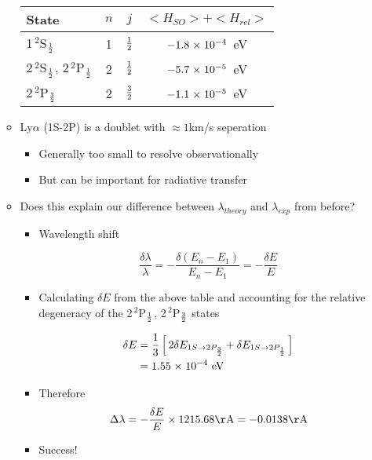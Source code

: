 \documentclass[12pt,letterpaper]{article}
\begin{document}
\begin{Aenumerate}
\begin{itemize}
\begin{itemize}
\begin{center}
\begin{tabular}{lccc}
\hline
State & $n$ & $j$ & $<H_{SO}> + <H_{rel}>$ \\
\hline
1\,$^2$S$_{\frac{1}{2}}$ & 1 & $\frac{1}{2}$ & $-1.8 {\; \times \; 10^{-4}}$~eV \\
2\,$^2$S$_{\frac{1}{2}}$, 2\,$^2$P$_{\frac{1}{2}}$ & 2 & $\frac{1}{2}$ & $-5.7 {\; \times \; 10^{-5}}$~eV \\
2\,$^2$P$_{\frac{3}{2}}$ & 2 & $\frac{3}{2}$ & $-1.1 {\; \times \; 10^{-5}}$~eV \\
\hline
\end{tabular}
\end{center}

	\item Ly$\alpha$ (1S-2P) is a doublet with $\approx 1$km/s seperation
		\begin{itemize}
		\item Generally too small to resolve observationally
		\item But can be important for radiative transfer 
		\end{itemize}
	\item Does this explain our difference between $\lambda_{theory}$
		and $\lambda_{exp}$ from before?
		\begin{itemize}
		\item Wavelength shift 

\begin{equation*}
\frac{\delta \lambda}{\lambda} = -\frac{\delta (E_n-E_1)}{E_n-E_1}
= - \frac{\delta E}{E}
\end{equation*}

		\item Calculating $\delta E$ from the above table and accounting
		for the relative degeneracy of the 2\,$^2$P$_{\frac{1}{2}}$, 2\,$^2$P$_{\frac{3}{2}}$
		states

\begin{align*}
\delta E &= \frac{1}{3} \left [ \, 2\delta E_{1S \to 2P_{\frac{3}{2}}} + \delta E_{1S \to 2P_{\frac{1}{2}}}
   \, \right ] \\
         &= 1.55 {\; \times \; 10^{-4}}~{\rm eV}
\end{align*}

		\item Therefore
\begin{equation*}
\Delta \lambda = -\frac{\delta E}{E} \times 1215.68 {\rm \AA} = -0.0138 {\rm \AA}
\end{equation*}
		\item Success!
		\end{itemize}

	\end{itemize}


\end{itemize}
\end{Aenumerate}
\end{document}
